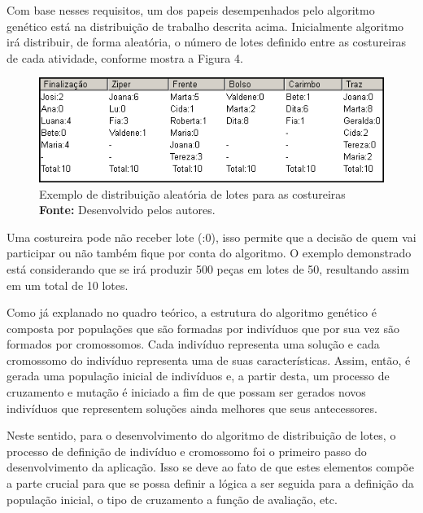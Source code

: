 \par Com base nesses requisitos, um dos papeis desempenhados pelo algoritmo genético está na distribuição de
trabalho descrita acima. Inicialmente algoritmo irá distribuir, de forma
aleatória, o número de lotes definido entre as costureiras de cada atividade, conforme mostra a Figura 4. 

\begin{figure}[h!]
	\centerline{\includegraphics[scale=1.0]{./imagens/distribuicao_exemplo.png}}
	\caption[Distribuição de trabalho]
	{Exemplo de distribuição aleatória de lotes para as costureiras \textbf{Fonte:}
	Desenvolvido pelos autores.}
	\label{fig:exemplo1}
\end{figure}

\par Uma costureira pode não receber lote (:0), isso permite que a decisão de
quem vai participar ou não também fique por conta do algoritmo. O exemplo demonstrado está considerando que se irá produzir 500 peças em lotes de 50, 
resultando assim em um total de 10 lotes.

\par Como já explanado no quadro teórico, a estrutura do algoritmo genético é composta
por populações que são formadas por indivíduos que por sua vez são formados por cromossomos.
Cada indivíduo representa uma solução e cada cromossomo do indivíduo representa uma de suas características. 
Assim, então, é gerada uma população inicial de indivíduos e, a partir desta, um
processo de cruzamento e mutação é iniciado a fim de que possam ser gerados
novos indivíduos que representem soluções ainda melhores que seus antecessores.

\par Neste sentido, para o desenvolvimento do algoritmo de distribuição de
lotes, o processo de definição de indivíduo e cromossomo foi o primeiro passo do desenvolvimento da aplicação. Isso se
deve ao fato de que estes elementos compõe a parte crucial para que se
possa definir a lógica a ser seguida para a definição da população inicial, o
tipo de cruzamento a função de avaliação, etc.

